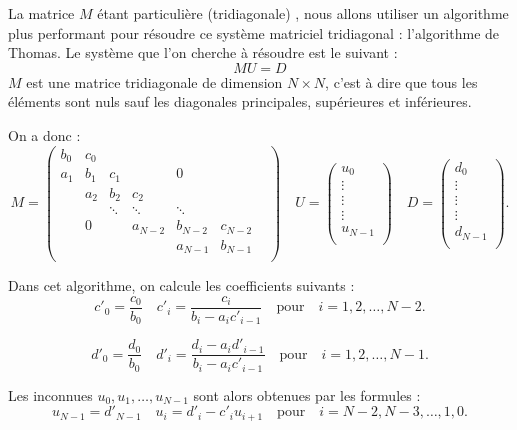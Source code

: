 \documentclass[10pt,fleqn]{article} %
\begin{document}
\ifprof
\else

\begin{obj}
La matrice $M$ étant particulière (tridiagonale) , nous allons utiliser un algorithme plus 
performant pour résoudre ce système matriciel tridiagonal : l'algorithme de Thomas.
 Le système que l'on cherche à résoudre est le suivant : 
$$
M U = D 
$$
$M$ est une matrice tridiagonale de dimension $N\times N$, c'est à dire que tous les éléments 
sont nuls sauf les diagonales principales, supérieures et inférieures. 
\end{obj}

On a donc : 
$$
M = 
\begin{pmatrix}
b_0 & c_0 &  &  &  &  & \\
a_1 & b_1 & c_1 & &0 & &\\
      & a_2 & b_2 & c_2 & & & \\
& & \ddots & \ddots & \ddots & \\
& 0& & a_{N-2} & b_{N-2} & c_{N-2}\\
& & & & a_{N-1} & b_{N-1}\\
\end{pmatrix}
\quad 
U = \begin{pmatrix}
u_0 \\
\vdots \\
\vdots \\
\vdots  \\
u_{N-1} \\
\end{pmatrix}
\quad 
D = \begin{pmatrix}
d_0 \\
\vdots \\
\vdots \\
\vdots  \\
d_{N-1} \\
\end{pmatrix}.
$$

Dans cet algorithme, on calcule les coefficients suivants : 
$$
c'_0 = \dfrac{c_0}{b_0} \quad c'_i = \dfrac{c_i}{b_i - a_i c'_{i-1}}  \quad \text{pour} \quad i=1,2,\ldots, N-2.$$

$$
d'_0 = \dfrac{d_0}{b_0} \quad d'_i = \dfrac{d_i-a_i d'_{i-1}}{b_i - a_i c'_{i-1}}  \quad \text{pour} \quad i=1,2,\ldots, N-1.
$$

Les inconnues $u_0, u_1, \ldots, u_{N-1}$ sont alors obtenues par les formules :
$$
u_{N-1} = d'_{N-1} \quad u_i = d'_i -c'_i u_{i+1} \quad  \text{pour} \quad i=N-2, N-3, \ldots, 1, 0.
$$

\fi
\end{document}
